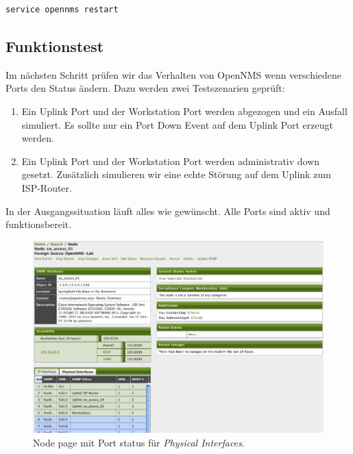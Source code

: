 \begin{lstlisting}[numbers=none]
service opennms restart
\end{lstlisting}

\subsection{Funktionstest}
Im nächsten Schritt prüfen wir das Verhalten von OpenNMS wenn verschiedene Ports den Status ändern. Dazu werden zwei Testszenarien geprüft:

\begin{enumerate}
  \item{Ein Uplink Port und der Workstation Port werden abgezogen und ein Ausfall simuliert. Es sollte nur ein Port Down Event auf dem Uplink Port erzeugt werden.}
  \item{Ein Uplink Port und der Workstation Port werden administrativ down gesetzt. Zusätzlich simulieren wir eine echte Störung auf dem Uplink zum ISP-Router.}
\end{enumerate}

In der Ausgangssituation läuft alles wie gewünscht. Alle Ports sind aktiv und funktionsbereit.

\begin{figure}[H]
	\centering
	\includegraphics[width=1.0\textwidth]{images/use-cases/monitoring-layer-2/node-page-snmpifpoller}
	\caption{Node page mit Port status für \emph{Physical Interfaces}.}
	\label{pic:node-page-snmpifpoller}
\end{figure}

